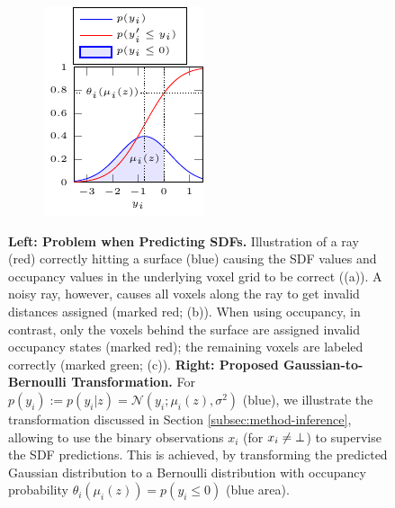 \begin{figure}
\begin{subfigure}[t]{0.5\linewidth}
        \includegraphics[width=1\linewidth]{fig/method_sdf_1}
    \end{subfigure}
    \vspace*{-10px}
    \caption{{\bf Left: Problem when Predicting SDFs.} Illustration of a ray ({\color{red}red}) correctly hitting a surface ({\color{blue}blue}) causing the SDF values and occupancy values in the underlying voxel grid to be correct (\cf (a)). A noisy ray, however, causes all voxels along the ray to get invalid distances assigned (marked {\colorbox{red!25}{red}}; \cf (b)). When using occupancy, in contrast, only the voxels behind the surface are assigned invalid occupancy states (marked {\colorbox{red!25}{red}}); the remaining voxels are labeled correctly (marked {\colorbox{green!25}{green}}; \cf (c)).
    {\bf Right: Proposed Gaussian-to-Bernoulli Transformation.} For $p(y_i) := p(y_i | z) = \mathcal{N}(y_i;\mu_i(z), \sigma^2)$ ({\color{blue}blue}), we illustrate the transformation discussed in Section \ref{subsec:method-inference}, allowing to use the binary observations $x_i$ (for $x_i \neq \bot$) to supervise the SDF predictions. This is achieved, by transforming the predicted Gaussian distribution to a Bernoulli distribution with occupancy probability $\theta_i(\mu_i(z)) = p(y_i \leq 0)$ ({\color{blue}blue area}).}
    \label{fig:method-sdf}
    \vspace*{-0.25cm}
\end{figure}

